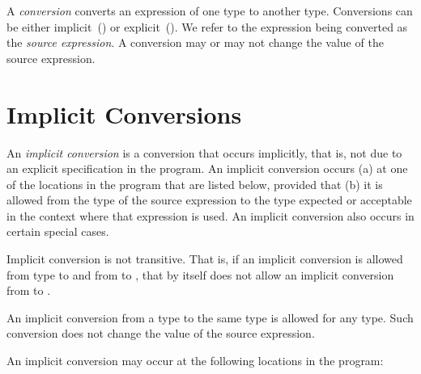 \label{Conversions}

A \emph{conversion} converts an expression of one type to another type.
Conversions can be either
implicit~() or
explicit~().
We refer to the expression being converted as the \emph{source expression}.
A conversion may or may not change the value of the source expression.


\section{Implicit Conversions}
\label{Implicit_Conversions}

An \emph{implicit conversion} is a conversion that occurs implicitly,
that is, not due to an explicit specification in the program.  An
implicit conversion occurs
(a) at one of the locations in the program that are listed below,
provided that
(b) it is allowed from the type of the source expression to the type
expected or acceptable in the context where that expression is used.
%
An implicit conversion also occurs in certain special cases.

Implicit conversion is not transitive. That is, if an implicit conversion
is allowed from type  to  and from  to ,
that by itself does not allow an implicit conversion
from  to .

An implicit conversion from a type to the same type is allowed for any type.
Such conversion does not change the value of the source expression.

An implicit conversion may occur at the following locations in the program:

